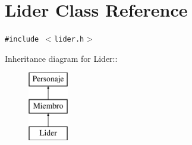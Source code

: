 \hypertarget{classLider}{
\section{Lider Class Reference}
\label{classLider}
}
{\tt \#include $<$lider.h$>$}

Inheritance diagram for Lider::\begin{figure}[H]
\begin{center}
\leavevmode
\includegraphics[height=3cm]{classLider}
\end{center}
\end{figure}
